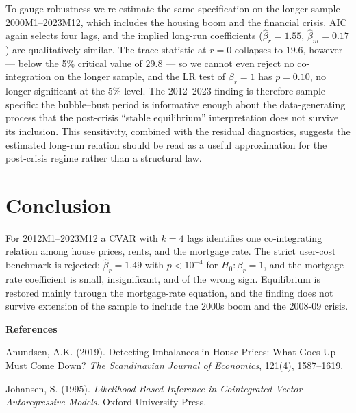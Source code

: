 \documentclass[12pt]{article}
\begin{document}
To gauge robustness we re-estimate the same specification on the longer sample 2000M1--2023M12, which includes the housing boom and the financial crisis. AIC again selects four lags, and the implied long-run coefficients ($\hat\beta_r=1.55$, $\hat\beta_m=0.17$) are qualitatively similar. The trace statistic at $r=0$ collapses to $19.6$, however --- below the 5\% critical value of $29.8$ --- so we cannot even reject no co-integration on the longer sample, and the LR test of $\beta_r=1$ has $p=0.10$, no longer significant at the 5\% level. The 2012--2023 finding is therefore sample-specific: the bubble--bust period is informative enough about the data-generating process that the post-crisis ``stable equilibrium'' interpretation does not survive its inclusion. This sensitivity, combined with the residual diagnostics, suggests the estimated long-run relation should be read as a useful approximation for the post-crisis regime rather than a structural law.

\section{Conclusion}

For 2012M1--2023M12 a CVAR with $k=4$ lags identifies one co-integrating relation among house prices, rents, and the mortgage rate. The strict user-cost benchmark is rejected: $\hat\beta_r=1.49$ with $p<10^{-4}$ for $H_0:\beta_r=1$, and the mortgage-rate coefficient is small, insignificant, and of the wrong sign. Equilibrium is restored mainly through the mortgage-rate equation, and the finding does not survive extension of the sample to include the 2000s boom and the 2008-09 crisis.

\bigskip
\noindent\textbf{References}

\noindent Anundsen, A.K. (2019). Detecting Imbalances in House Prices: What Goes Up Must Come Down? \textit{The Scandinavian Journal of Economics}, 121(4), 1587--1619.

\noindent Johansen, S. (1995). \textit{Likelihood-Based Inference in Cointegrated Vector Autoregressive Models}. Oxford University Press.
\end{document}
